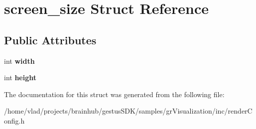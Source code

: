 \hypertarget{structscreen__size}{}\section{screen\+\_\+size Struct Reference}
\label{structscreen__size}
\subsection*{Public Attributes}
\begin{DoxyCompactItemize}
\item 
\mbox{\label{structscreen__size_a2a3e9dbcc18f5b851d92481b8a160e96}} 
int {\bfseries width}
\item 
\mbox{\label{structscreen__size_a6e7910716d1da5d28c9a6ec3ec07863d}} 
int {\bfseries height}
\end{DoxyCompactItemize}


The documentation for this struct was generated from the following file\+:\begin{DoxyCompactItemize}
\item 
/home/vlad/projects/brainhub/gestus\+S\+D\+K/samples/gr\+Visualization/inc/render\+Config.\+h\end{DoxyCompactItemize}
